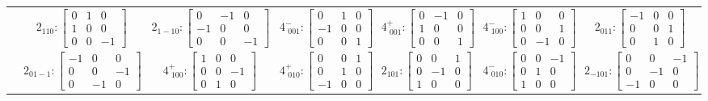 \documentclass[fleqn,8pt,landscape]{jsarticle}
\begin{document}
\begin{longtable}{ccccccc}
& $ 2{}_{110}:\begin{bmatrix} 0 & 1 & 0 \\ 1 & 0 & 0 \\ 0 & 0 & -1 \end{bmatrix} $ & $ 2{}_{1-10}:\begin{bmatrix} 0 & -1 & 0 \\ -1 & 0 & 0 \\ 0 & 0 & -1 \end{bmatrix} $ & $ 4^{-}_{\,\,001}:\begin{bmatrix} 0 & 1 & 0 \\ -1 & 0 & 0 \\ 0 & 0 & 1 \end{bmatrix} $ & $ 4^{+}_{\,\,001}:\begin{bmatrix} 0 & -1 & 0 \\ 1 & 0 & 0 \\ 0 & 0 & 1 \end{bmatrix} $ & $ 4^{-}_{\,\,100}:\begin{bmatrix} 1 & 0 & 0 \\ 0 & 0 & 1 \\ 0 & -1 & 0 \end{bmatrix} $ & $ 2{}_{011}:\begin{bmatrix} -1 & 0 & 0 \\ 0 & 0 & 1 \\ 0 & 1 & 0 \end{bmatrix} $ \\
& $ 2{}_{01-1}:\begin{bmatrix} -1 & 0 & 0 \\ 0 & 0 & -1 \\ 0 & -1 & 0 \end{bmatrix} $ & $ 4^{+}_{\,\,100}:\begin{bmatrix} 1 & 0 & 0 \\ 0 & 0 & -1 \\ 0 & 1 & 0 \end{bmatrix} $ & $ 4^{+}_{\,\,010}:\begin{bmatrix} 0 & 0 & 1 \\ 0 & 1 & 0 \\ -1 & 0 & 0 \end{bmatrix} $ & $ 2{}_{101}:\begin{bmatrix} 0 & 0 & 1 \\ 0 & -1 & 0 \\ 1 & 0 & 0 \end{bmatrix} $ & $ 4^{-}_{\,\,010}:\begin{bmatrix} 0 & 0 & -1 \\ 0 & 1 & 0 \\ 1 & 0 & 0 \end{bmatrix} $ & $ 2{}_{-101}:\begin{bmatrix} 0 & 0 & -1 \\ 0 & -1 & 0 \\ -1 & 0 & 0 \end{bmatrix} $ \\

\end{longtable}
\end{document}
